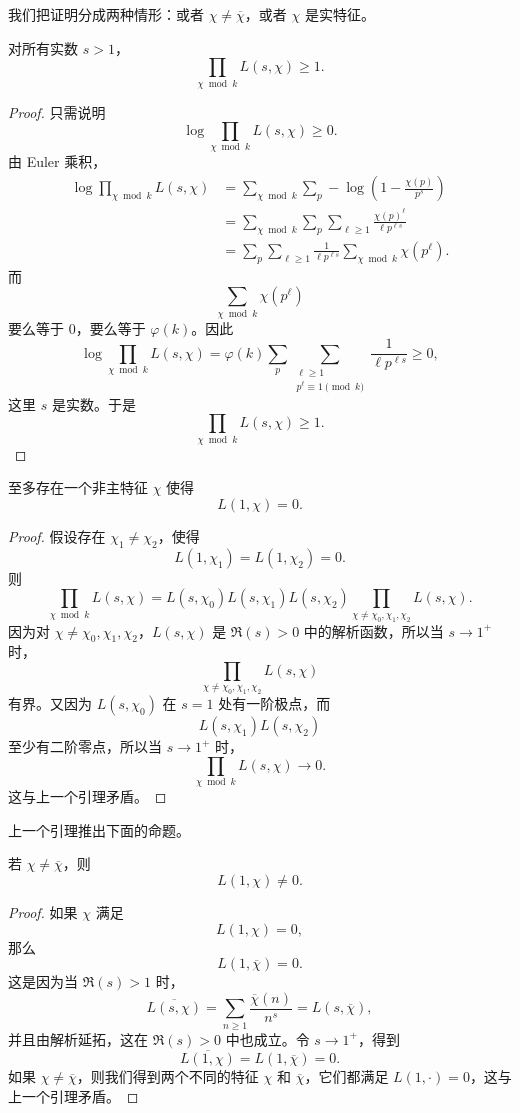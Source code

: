 我们把证明分成两种情形：或者 $\chi\neq\overline{\chi}$，或者 $\chi$ 是实特征。

\begin{lemma}
	对所有实数 $s>1$，
	\[
		\prod_{\chi\bmod k}L(s,\chi)\geq 1.
	\]
\end{lemma}

\begin{proof}
	只需说明
	\[
		\log\prod_{\chi\bmod k}L(s,\chi)\geq 0.
	\]
	由 Euler 乘积，
	\[
\begin{aligned}
	\log\prod_{\chi\bmod k}L(s,\chi)
	&=
	\sum_{\chi\bmod k}\sum_p
	-\log\left(1-\frac{\chi(p)}{p^s}\right)  \\
	&=
	\sum_{\chi\bmod k}\sum_p\sum_{\ell\geq 1}
	\frac{\chi(p)^\ell}{\ell p^{\ell s}}  \\
	&=
	\sum_p\sum_{\ell\geq 1}\frac{1}{\ell p^{\ell s}}
	\sum_{\chi\bmod k}\chi(p^\ell).
\end{aligned}
	\]
	而
	\[
		\sum_{\chi\bmod k}\chi(p^\ell)
	\]
	要么等于 $0$，要么等于 $\varphi(k)$。因此
	\[
		\log\prod_{\chi\bmod k}L(s,\chi)
		=
		\varphi(k)
		\sum_p
		\sum_{\substack{\ell\geq 1\\ p^\ell\equiv 1\pmod k}}
		\frac{1}{\ell p^{\ell s}}
		\geq 0,
	\]
	这里 $s$ 是实数。于是
	\[
		\prod_{\chi\bmod k}L(s,\chi)\geq 1.
	\]
\end{proof}

\begin{lemma}
	至多存在一个非主特征 $\chi$ 使得
	\[
		L(1,\chi)=0.
	\]
\end{lemma}

\begin{proof}
	假设存在 $\chi_1\neq\chi_2$，使得
	\[
		L(1,\chi_1)=L(1,\chi_2)=0.
	\]
	则
	\[
		\prod_{\chi\bmod k}L(s,\chi)
		=
		L(s,\chi_0)L(s,\chi_1)L(s,\chi_2)
		\prod_{\chi\neq\chi_0,\chi_1,\chi_2}L(s,\chi).
	\]
	因为对 $\chi\neq\chi_0,\chi_1,\chi_2$，$L(s,\chi)$ 是 $\Re(s)>0$ 中的解析函数，所以当 $s\to1^+$ 时，
	\[
		\prod_{\chi\neq\chi_0,\chi_1,\chi_2}L(s,\chi)
	\]
	有界。又因为 $L(s,\chi_0)$ 在 $s=1$ 处有一阶极点，而
	\[
		L(s,\chi_1)L(s,\chi_2)
	\]
	至少有二阶零点，所以当 $s\to1^+$ 时，
	\[
		\prod_{\chi\bmod k}L(s,\chi)\to0.
	\]
	这与上一个引理矛盾。
\end{proof}

上一个引理推出下面的命题。

\begin{proposition}
	若 $\chi\neq\overline{\chi}$，则
	\[
		L(1,\chi)\neq0.
	\]
\end{proposition}

\begin{proof}
	如果 $\chi$ 满足
	\[
		L(1,\chi)=0,
	\]
	那么
	\[
		L(1,\overline{\chi})=0.
	\]
	这是因为当 $\Re(s)>1$ 时，
	\[
		\overline{L(s,\chi)}
		=
		\sum_{n\geq 1}\frac{\overline{\chi}(n)}{n^s}
		=
		L(s,\overline{\chi}),
	\]
	并且由解析延拓，这在 $\Re(s)>0$ 中也成立。令 $s\to1^+$，得到
	\[
		\overline{L(1,\chi)}=L(1,\overline{\chi})=0.
	\]
	如果 $\chi\neq\overline{\chi}$，则我们得到两个不同的特征 $\chi$ 和 $\overline{\chi}$，它们都满足 $L(1,\cdot)=0$，这与上一个引理矛盾。
\end{proof}

